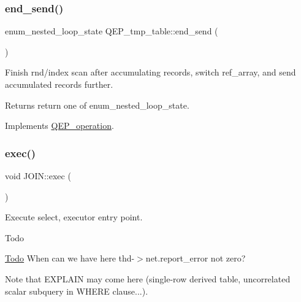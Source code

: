 \subsubsection{\texorpdfstring{end\+\_\+send()}{end\_send()}}
{\footnotesize\ttfamily enum\+\_\+nested\+\_\+loop\+\_\+state Q\+E\+P\+\_\+tmp\+\_\+table\+::end\+\_\+send (\begin{DoxyParamCaption}{ }\end{DoxyParamCaption})\hspace{0.3cm}{\ttfamily [virtual]}}



Finish rnd/index scan after accumulating records, switch ref\+\_\+array, and send accumulated records further. 

\begin{DoxyReturn}{Returns}
return one of enum\+\_\+nested\+\_\+loop\+\_\+state. 
\end{DoxyReturn}


Implements \mbox{\hyperlink{classQEP__operation_a4faf706cddaf3ae613fe92434776df5e}{Q\+E\+P\+\_\+operation}}.

\mbox{\label{group__Query__Executor_ga31581f58624b85919d7c6cd632157929}} 
\subsubsection{\texorpdfstring{exec()}{exec()}}
{\footnotesize\ttfamily void J\+O\+I\+N\+::exec (\begin{DoxyParamCaption}{ }\end{DoxyParamCaption})}

Execute select, executor entry point.

\begin{DoxyRefDesc}{Todo}
\item[\mbox{\hyperlink{todo__todo000080}{Todo}}]When can we have here thd-\/$>$net.\+report\+\_\+error not zero?\end{DoxyRefDesc}


\begin{DoxyNote}{Note}
that E\+X\+P\+L\+A\+IN may come here (single-\/row derived table, uncorrelated scalar subquery in W\+H\+E\+RE clause...). 
\end{DoxyNote}
\mbox{\label{group__Query__Executor_ga8a8f8266528e6e4f33f31333f5f3cd8a}} 

